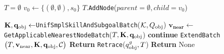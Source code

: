 \begin{algorithm}[H]
\caption{\texttt{\gpuskillrrt}($s_0, \qobj^g, \skillset, \connectorskillset,\Qobj$)}
\begin{algorithmic}[1]
\State $T=\emptyset$   
\State $v_{0} \gets \{(\emptyset, \emptyset), s_0\}$ 
\State $T$.\texttt{AddNode}($parent=\emptyset, child=v_{0}$)

    \State $\mathbf{K}, \mathbf{q_\text{obj}} \gets ${\texttt{UnifSmplSkillAndSubgoalBatch}}($\mathcal{K}, Q_\text{obj}$)
    \State $\mathbf{{v}_{\text{near}}} \gets$ {\texttt{GetApplicableNearestNodeBatch}}($T, \mathbf{K}, \mathbf{q_\text{obj}}$)
        \State \textbf{continue}
    \EndIf
    \State \texttt{ExtendBatch}$\big(T, \mathbf{v_{\text{near}}}, \mathbf{K}, \mathbf{q_\text{obj}}, \mathcal{C}\big)$
        \State \textbf{Return} \texttt{Retrace}($q_\text{obj}^g, T$)
    \EndIf
\EndFor
\State \textbf{Return} None

\end{algorithmic}
\label{algo:gpuskillrrtbackbone}
\end{algorithm}